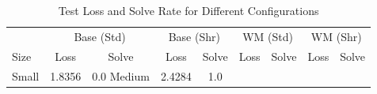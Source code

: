\begin{table}[t]
\centering
\caption{Test Loss and Solve Rate for Different Configurations}
\begin{tabular}{l|cc|cc|cc|cc}
\hline
& \multicolumn{2}{c|}{Base (Std)} & \multicolumn{2}{c|}{Base (Shr)} & \multicolumn{2}{c|}{WM (Std)} & \multicolumn{2}{c}{WM (Shr)} \\
Size & Loss & Solve & Loss & Solve & Loss & Solve & Loss & Solve \\
\hline
Small & 1.8356 & 0.0%
Medium & 2.4284 & 1.0%
\hline
\end{tabular}
\end{table}
